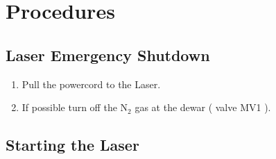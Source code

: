 \section{Procedures}

\subsection{Laser Emergency Shutdown}
\begin{enumerate}
\item Pull the powercord to the Laser.
\item If possible turn off the N$_2$ gas at the dewar ( valve MV1 ). 
\end{enumerate}


\subsection{Starting the Laser}

